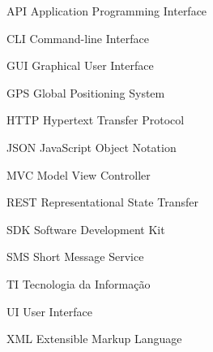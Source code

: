 
\begin{siglas}
 \item[API] Application Programming Interface
 \item[CLI] Command-line Interface
 \item[GUI] Graphical User Interface
 \item[GPS] Global Positioning System
 \item[HTTP] Hypertext Transfer Protocol
 \item[JSON] JavaScript Object Notation
 \item[MVC] Model View Controller
 \item[REST] Representational State Transfer
 \item[SDK] Software Development Kit
 \item[SMS] Short Message Service
 \item[TI] Tecnologia da Informação
 \item[UI] User Interface
 \item[XML] Extensible Markup Language
\end{siglas}
